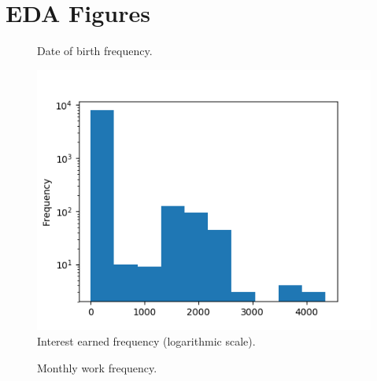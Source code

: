 \section{EDA Figures}

\begin{figure}[!h]
    \caption{Date of birth frequency.}
    \label{fig:birth_date_freq}
    \centering
    
\end{figure}


\begin{figure}[!h]
    \caption{Interest earned frequency (logarithmic scale).}
    \label{fig:interest_earned_freq}
    \centering
%    
    \includegraphics{./img/interest_earned_freq.png}
\end{figure}

\begin{figure}[!h]
    \caption{Monthly work frequency.}
    \label{fig:monthly_work_freq}
    \centering
    
\end{figure}
